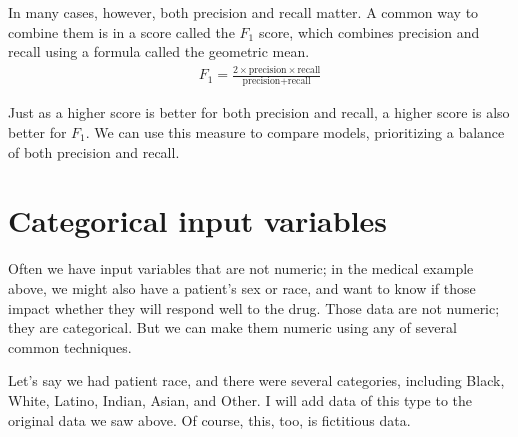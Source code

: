 \documentclass[letterpaper,10pt,english]{sphinxmanual}
\begin{document}
In many cases, however, both precision and recall matter.  A common way to combine them is in a score called the \(F_1\) score, which combines precision and recall using a formula called the geometric mean.
\begin{equation*}
\begin{split}F_1=\frac{2\times\text{precision}\times\text{recall}}{\text{precision}+\text{recall}}\end{split}
\end{equation*}
\begin{sphinxVerbatim}[commandchars=\\\{\}]
            
\end{sphinxVerbatim}

Just as a higher score is better for both precision and recall, a higher score is also better for \(F_1\).  We can use this measure to compare models, prioritizing a balance of both precision and recall.


\section{Categorical input variables}
\label{\detokenize{chapter-17-machine-learning:categorical-input-variables}}
Often we have input variables that are not numeric; in the medical example above, we might also have a patient’s sex or race, and want to know if those impact whether they will respond well to the drug.  Those data are not numeric; they are categorical.  But we can make them numeric using any of several common techniques.

Let’s say we had patient race, and there were several categories, including Black, White, Latino, Indian, Asian, and Other.  I will add data of this type to the original data we saw above.  Of course, this, too, is fictitious data.
\end{document}
